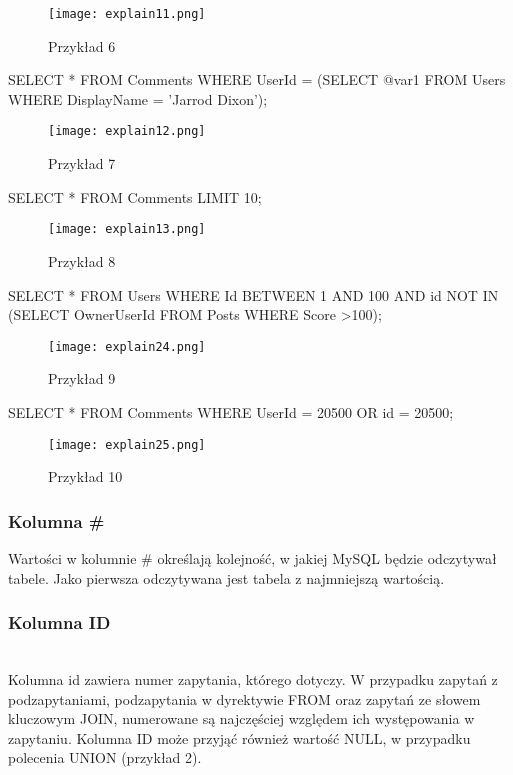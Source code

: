 \begin{figure}[H]
	\texttt{[image: explain11.png]} 
	\caption{Przykład 6}
\end{figure}
\begin{spverbatim}
	SELECT * FROM Comments WHERE UserId = (SELECT @var1 FROM Users WHERE DisplayName = 'Jarrod Dixon');
\end{spverbatim}
\begin{figure}[H]
	\texttt{[image: explain12.png]} 
	\caption{Przykład 7}
\end{figure}
\begin{spverbatim}
SELECT * FROM Comments LIMIT 10;
\end{spverbatim}
\begin{figure}[H]
	\texttt{[image: explain13.png]} 
	\caption{Przykład 8}
\end{figure}
\begin{spverbatim}
	SELECT * FROM Users WHERE Id BETWEEN 1 AND 100 AND 
	id NOT IN (SELECT OwnerUserId FROM Posts WHERE Score >100);
\end{spverbatim}
\begin{figure}[H]
	\texttt{[image: explain24.png]} 
	\caption{Przykład 9}
\end{figure}
\begin{spverbatim}
	SELECT * FROM Comments WHERE UserId = 20500 OR id = 20500;
\end{spverbatim}
\begin{figure}[H]
	\texttt{[image: explain25.png]} 
	\caption{Przykład 10}
\end{figure}

\subsubsection{Kolumna \#}
Wartości w kolumnie \# określają kolejność, w jakiej MySQL będzie odczytywał tabele. Jako pierwsza odczytywana jest tabela z najmniejszą wartością.

\subsubsection{Kolumna ID}\leavevmode\\
Kolumna id zawiera numer zapytania, którego dotyczy. W przypadku zapytań z podzapytaniami, podzapytania w dyrektywie FROM oraz zapytań ze słowem kluczowym JOIN, numerowane są najczęściej względem ich występowania w zapytaniu. Kolumna ID może przyjąć również wartość NULL, w przypadku polecenia UNION (przykład 2).

